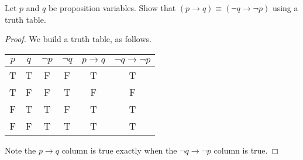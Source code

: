 \documentclass[../notes.tex]{subfiles}
\begin{document}
\begin{example}[contraposition] \label{ex:contraposition}
    Let $p$ and $q$ be proposition variables. Show that $(p\to q)\equiv(\lnot q\to\lnot p)$ using a truth table.
\end{example}
\begin{proof}
    We build a truth table, as follows.
    \begin{center}
        \begin{tabular}{c|c|c|c||c|c}
            $p$ & $q$ & $\lnot p$ & $\lnot q$ & $p\to q$ & $\lnot q\to\lnot p$ \\\hline
            T & T & F & F & T & T \\
            T & F & F & T & F & F \\
            F & T & T & F & T & T \\
            F & F & T & T & T & T
        \end{tabular}
    \end{center}
    Note the $p\to q$ column is true exactly when the $\lnot q\to\lnot p$ column is true.
\end{proof}
\end{document}
